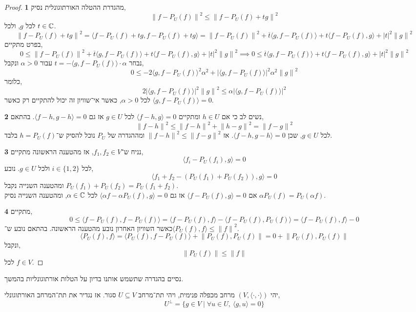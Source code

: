 \begin{proof}
	\textbf{1}
	מהגדרת ההטלה האורתוגונלית נסיק,
	\[
		{\lVert f - P_U(f) \rVert}^2
		\le {\lVert f - P_U(f) + t g \rVert}^2
	\]
	לכל $g$, ולכל $t \in \mathbb{C}$.
	\[
		{\lVert f - P_U(f) + t g \rVert}^2
		= \langle f - P_U(f) + t g, f - P_U(f) + t g \rangle
		= {\lVert f - P_U(f) \rVert}^2 + \overline{t} \langle g, f - P_U(f) \rangle + t \langle f - P_U(f), g \rangle + {|t|}^2 {\lVert g \rVert}^2
	\]
	בפרט מתקיים,
	\[
		0 \le {\lVert f - P_U(f) \rVert}^2 + \overline{t} \langle g, f - P_U(f) \rangle + t \langle f - P_U(f), g \rangle + {|t|}^2 {\lVert g \rVert}^2
		\implies
		0 \le \overline{t} \langle g, f - P_U(f) \rangle + t \langle f - P_U(f), g \rangle + {|t|}^2 {\lVert g \rVert}^2
	\]
	נבחר $t = - \langle g, f - P_U(f) \rangle \cdot \alpha$ עבור $\alpha > 0$ ונקבל,
	\[
		0 \le -2 {\langle g, f - P_U(f) \rangle}^2 \alpha^2 + {|\langle g, f - P_U(f) \rangle|}^2 \alpha^2 {\lVert g \rVert}^2
	\]
	כלומר,
	\[
		2 {\left\lvert \langle g, f - P_U(f) \rangle \right\rvert}^2 {\lVert g \rVert}^2
		\le \alpha {\left\lvert \langle g, f - P_U(f) \rangle \right\rvert}^2
	\]
	לכל $\alpha > 0$, כאשר אי־שוויון זה יכול להתקיים רק כאשר $\langle g, f - P_U(f) \rangle = 0$.

	\textbf{2}
	נשים לב כי אם $h \in U$ ומתקיים $\langle f - h, g \rangle = 0$ לכל $g \in U$ אז גם $\langle f - h, g - h \rangle = 0$.
	בהתאם,
	\[
		{\lVert f - h \rVert}^2
		\le {\lVert f - h \rVert}^2 + {\lVert h - g \rVert}^2
		= {\lVert f - g \rVert}^2
	\]
	לכל $g \in U$, שכן $\langle f - h, g - h \rangle = 0$.
	אז ${\lVert f - h \rVert}^2 \le {\lVert f - g \rVert}^2$ ומההגדרה של $P_U$ נוכל להסיק ש־$h = P_U(f)$ בלבד.

	\textbf{3}
	נניח ש־$f_1, f_2 \in V$, אז מהטענה הראשונה מתקיים,
	\[
		\langle f_i - P_U(f_i), g \rangle = 0
	\]
	לכל $i \in \{1, 2\}$ ולכל $g \in U$.
	נובע,
	\[
		\langle f_1 + f_2 - (P_U(f_1) + P_U(f_2)), g \rangle = 0
	\]
	ומהטענה השנייה נקבל $P_U(f_1) + P_U(f_2) = P_U(f_1 + f_2)$. \\
	אם $\langle f - P_U(f), g \rangle = 0$ אז גם $\langle \alpha f - \alpha P_U(f), g \rangle = 0$ לכל $\alpha \in \mathbb{C}$, ומהטענה השנייה נסיק $\alpha P_U(f) = P_U(\alpha f)$.

	\textbf{4}
	מתקיים,
	\[
		0
		\le \langle f - P_U(f), f - P_U(f) \rangle
		= \langle f - P_U(f), f \rangle - \langle f - P_U(f), P_U(f) \rangle
		= \langle f - P_U(f), f \rangle - 0
	\]
	כאשר השוויון האחרון נובע מהטענה הראשונה.
	בהתאם נובע ש־$\langle P_U(f), f \rangle \le {\lVert f \rVert}^2$.
	\[
		\langle P_U(f), f \rangle
		= \langle P_U(f), f - P_U(f) \rangle + \lVert P_U(f), P_U(f) \rVert
		= 0 + \lVert P_U(f), P_U(f) \rVert
	\]
	ונקבל,
	\[
		\lVert P_U(f) \rVert \le \lVert f \rVert
	\]
	לכל $f \in V$.
\end{proof}
נסיים בהגדרה שתשמש אותנו בדיון על הטלות אורתוגונליות בהמשך.
\begin{definition}
	יהי $(V, \langle \cdot, \cdot \rangle)$ מרחב מכפלה פנימית, ויהי תת־מרחב $U \subseteq V$ סגור.
	אז נגדיר את תת־המרחב האורתוגונלי,
	\[
		U^\perp
		= \{ g \in V \mid \forall u \in U,\ \langle g, u \rangle = 0 \}
	\]
\end{definition}

\listoftheorems[title=הגדרות ומשפטים,ignoreall,show={theorem,definition},swapnumber,onlynamed={proposition,lemma}]



